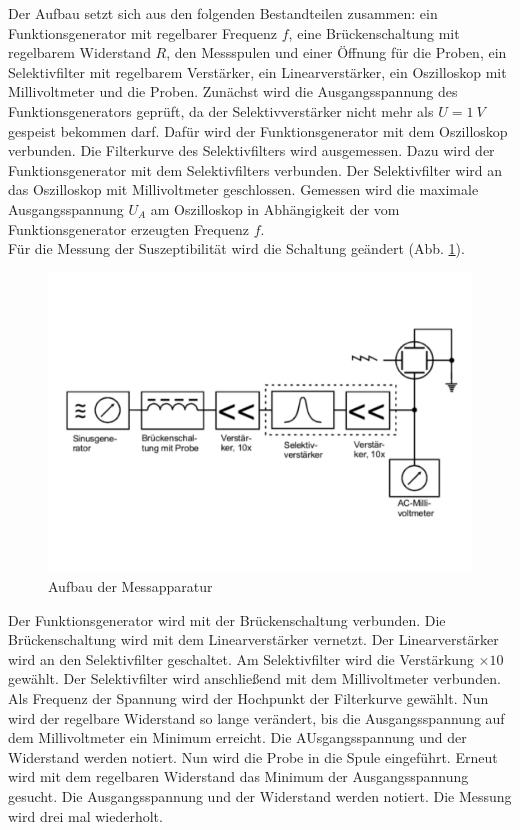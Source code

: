 Der Aufbau setzt sich aus den folgenden Bestandteilen zusammen: ein Funktionsgenerator mit regelbarer Frequenz $f$, eine Brückenschaltung mit regelbarem Widerstand $R$, den Messspulen und einer Öffnung für die Proben, ein Selektivfilter mit regelbarem Verstärker, ein Linearverstärker, ein Oszilloskop mit Millivoltmeter und die Proben.
Zunächst wird die Ausgangsspannung des Funktionsgenerators geprüft, da der Selektivverstärker nicht mehr als $U=\SI{1}{V}$ gespeist bekommen darf.
Dafür wird der Funktionsgenerator mit dem Oszilloskop verbunden.
Die Filterkurve des Selektivfilters wird ausgemessen.
Dazu wird der Funktionsgenerator mit dem Selektivfilters verbunden.
Der Selektivfilter wird an das Oszilloskop mit Millivoltmeter geschlossen.
Gemessen wird die maximale Ausgangsspannung $U_A$ am Oszilloskop in Abhängigkeit der vom Funktionsgenerator erzeugten Frequenz $f$.
\\Für die Messung der Suszeptibilität wird die Schaltung geändert (Abb. \ref{fig:aufbau}).
\begin{figure}[h!]
  \centering
  \includegraphics[width=\textwidth]{606aufbau.pdf}
  \caption{Aufbau der Messapparatur \cite{1}}
  \label{fig:aufbau}
\end{figure}
Der Funktionsgenerator wird mit der Brückenschaltung verbunden.
Die Brückenschaltung wird mit dem Linearverstärker vernetzt.
Der Linearverstärker wird an den Selektivfilter geschaltet.
Am Selektivfilter wird die Verstärkung $\times 10$ gewählt.
Der Selektivfilter wird anschließend mit dem Millivoltmeter verbunden.
Als Frequenz der Spannung wird der Hochpunkt der Filterkurve gewählt.
Nun wird der regelbare Widerstand so lange verändert, bis die Ausgangsspannung auf dem Millivoltmeter ein Minimum erreicht.
Die AUsgangsspannung und der Widerstand werden notiert.
Nun wird die Probe in die Spule eingeführt.
Erneut wird mit dem regelbaren Widerstand das Minimum der Ausgangsspannung gesucht.
Die Ausgangsspannung und der Widerstand werden notiert.
Die Messung wird drei mal wiederholt.
